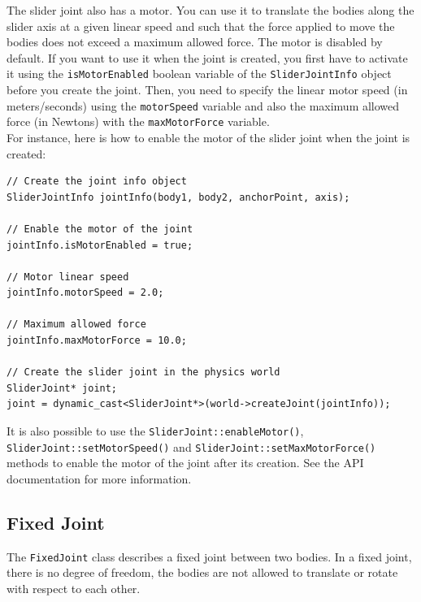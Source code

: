 \documentclass[a4paper,12pt]{article}
\begin{document}
     The slider joint also has a motor. You can use it to translate the bodies along the slider axis at a given linear speed and such that the force applied to
     move the bodies does not exceed a maximum allowed force. The motor is disabled by default. If you want to use it when the joint is created, you first have to activate it using the
     \texttt{isMotorEnabled} boolean variable of the \texttt{SliderJointInfo} object before you create the joint. Then, you need to specify the linear motor speed (in meters/seconds)
     using the \texttt{motorSpeed} variable and also the maximum allowed force (in Newtons) with the \texttt{maxMotorForce} variable. \\

     For instance, here is how to enable the motor of the slider joint when the joint is created: \\

     \begin{lstlisting}
// Create the joint info object
SliderJointInfo jointInfo(body1, body2, anchorPoint, axis);

// Enable the motor of the joint
jointInfo.isMotorEnabled = true;

// Motor linear speed
jointInfo.motorSpeed = 2.0;

// Maximum allowed force
jointInfo.maxMotorForce = 10.0;

// Create the slider joint in the physics world
SliderJoint* joint;
joint = dynamic_cast<SliderJoint*>(world->createJoint(jointInfo));
  \end{lstlisting}

     \vspace{0.6cm}

     \begin{sloppypar}
        It is also possible to use the \texttt{SliderJoint::enableMotor()}, \texttt{SliderJoint::setMotorSpeed()} and \texttt{SliderJoint::setMaxMotorForce()} methods to enable the
        motor of the joint after its creation. See the API documentation for more information.
     \end{sloppypar}

    \subsection{Fixed Joint}

    The \texttt{FixedJoint} class describes a fixed joint between two bodies. In a fixed joint, there is no degree of freedom, the bodies are not
    allowed to translate or rotate with respect to each other. \\
\end{document}
